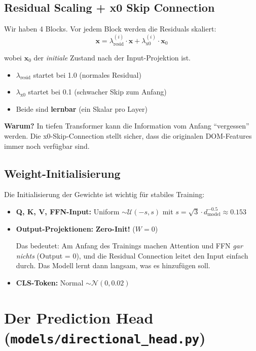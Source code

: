 \documentclass[12pt, a4paper]{article}
\begin{document}
\subsection{Residual Scaling + x0 Skip Connection}

Wir haben 4 Blocks. Vor jedem Block werden die Residuals skaliert:
\[
    \mathbf{x} = \lambda_\text{resid}^{(i)} \cdot \mathbf{x} + \lambda_\text{x0}^{(i)} \cdot \mathbf{x}_0
\]

wobei $\mathbf{x}_0$ der \textit{initiale} Zustand nach der Input-Projektion ist.

\begin{itemize}
    \item $\lambda_\text{resid}$ startet bei 1.0 (normales Residual)
    \item $\lambda_\text{x0}$ startet bei 0.1 (schwacher Skip zum Anfang)
    \item Beide sind \textbf{lernbar} (ein Skalar pro Layer)
\end{itemize}

\textbf{Warum?} In tiefen Transformer kann die Information vom Anfang
``vergessen'' werden. Die x0-Skip-Connection stellt sicher, dass die
originalen DOM-Features immer noch verf\"ugbar sind.

\subsection{Weight-Initialisierung}

Die Initialisierung der Gewichte ist wichtig f\"ur stabiles Training:

\begin{itemize}
    \item \textbf{Q, K, V, FFN-Input:} Uniform $\sim \mathcal{U}(-s, s)$ mit
          $s = \sqrt{3} \cdot d_\text{model}^{-0.5} \approx 0.153$
    \item \textbf{Output-Projektionen:} \textbf{Zero-Init!} ($W = 0$)

    Das bedeutet: Am Anfang des Trainings machen Attention und FFN
    \textit{gar nichts} (Output = 0), und die Residual Connection leitet
    den Input einfach durch. Das Modell lernt dann langsam, was es
    hinzuf\"ugen soll.
    \item \textbf{CLS-Token:} Normal $\sim \mathcal{N}(0, 0.02)$
\end{itemize}


\newpage
\section{Der Prediction Head (\texttt{models/directional\_head.py})}
\end{document}
